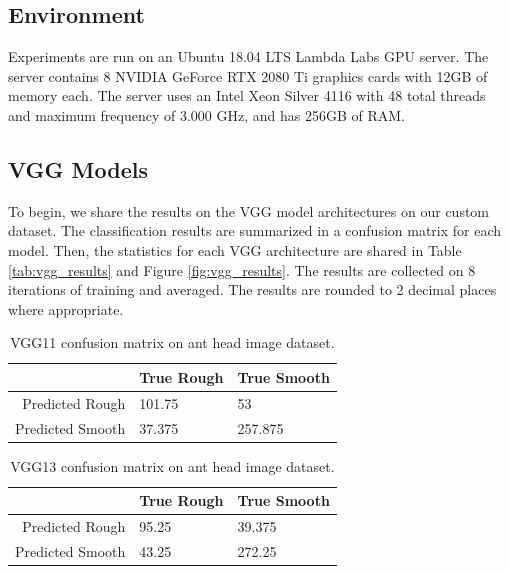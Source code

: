 \documentclass{aci}
\numberwithin{equation}{section}
\begin{document}
\subsection{Environment}

Experiments are run on an Ubuntu 18.04 LTS Lambda Labs GPU server. The server
contains 8 NVIDIA GeForce RTX 2080 Ti graphics cards with 12GB of memory each.
The server uses an Intel Xeon Silver 4116 with 48 total threads and maximum
frequency of 3.000 GHz, and has 256GB of RAM.

\subsection{VGG Models}

To begin, we share the results on the VGG model architectures on our custom
dataset. The classification results are summarized in a confusion matrix for
each model. Then, the statistics for each VGG architecture are shared in Table
\ref{tab:vgg_results} and Figure \ref{fig:vgg_results}. The results are
collected on 8 iterations of training and averaged. The results are
rounded to 2 decimal places where appropriate.

\vspace{0.5in}

\begin{table}[h]
    \centering
    \caption{VGG11 confusion matrix on ant head image dataset.}
    \begin{tabular}{r|ll}
                         & True Rough & True Smooth \\
        \hline
        Predicted Rough  & 101.75     & 53          \\
        Predicted Smooth & 37.375     & 257.875     \\
    \end{tabular}
    \label{tab:vgg11_confusion_matrix}
\end{table}

\vspace{0.5in}

\begin{table}[h]
    \centering
    \caption{VGG13 confusion matrix on ant head image dataset.}
    \begin{tabular}{r|ll}
                         & True Rough & True Smooth \\
        \hline
        Predicted Rough  & 95.25      & 39.375      \\
        Predicted Smooth & 43.25      & 272.25      \\
    \end{tabular}
    \label{tab:vgg13_confusion_matrix}
\end{table}
\end{document}
